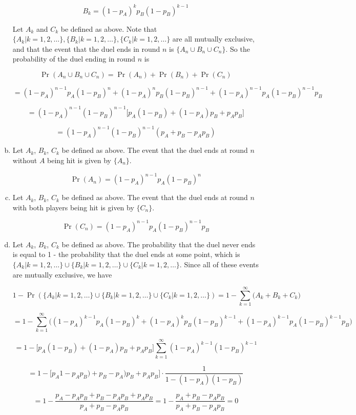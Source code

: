 \documentclass{article}
\begin{document}
\begin{enumerate}[(a)]
\[
B_k = (1 - p_A)^{{k}}p_B(1 - p_B)^{k-1}
\]

Let \(A_k\) and \(C_k\) be defined as above. Note that \(\{A_k | k = 1, 2, \ldots\} , \{B_k | k = 1, 2, \ldots\}, \{C_k | k = 1, 2, \ldots\}\) are all mutually exclusive, and that the event that the duel ends in round \(n\) is \(\{A_n \cup B_n \cup C_n\}\). So the probability of the duel ending in round \(n\) is

\[
\Pr(A_n \cup B_n \cup C_n) = \Pr(A_n) + \Pr(B_n) + \Pr(C_n) 
\]

\[
= (1 - p_A)^{n-1}p_A(1 - p_B)^{n} + (1 - p_A)^{{n}}p_B(1 - p_B)^{n-1} + (1 - p_A)^{{n-1}}p_A(1 - p_B)^{n-1}p_B
\]

\[
= (1 - p_A)^{n-1}(1 - p_B)^{n-1} \big[p_A(1 - p_B) + (1 - p_A)p_B + p_Ap_B \big]
\]

\[
= \boxed{(1 - p_A)^{n-1}(1 - p_B)^{n-1} (p_A + p_B - p_Ap_B )}
\]

\item Let \(A_k\), \(B_k\), \(C_k\) be defined as above. The event that the duel ends at round \(n\) without \(A\) being hit is given by \(\{ A_n\} \). 

\[
\Pr(A_n) = \boxed{(1 - p_A)^{{n-1}}p_A(1 - p_B)^{n}}
\]

\item Let \(A_k\), \(B_k\), \(C_k\) be defined as above. The event that the duel ends at round \(n\) with both players being hit is given by \(\{ C_n\} \). 

\[
\Pr(C_n) = \boxed{(1 - p_A)^{{n-1}}p_A(1 - p_B)^{n-1}p_B}
\]

\item Let \(A_k\), \(B_k\), \(C_k\) be defined as above. The probability that the duel never ends is equal to 1 - the probability that the duel ends at some point, which is  \(\{A_k | k = 1, 2, \ldots\} \cup \{B_k | k = 1, 2, \ldots\} \cup \{C_k | k = 1, 2, \ldots\}\). Since all of these events are mutually exclusive, we have

\[
1 - \Pr(\{A_k | k = 1, 2, \ldots\} \cup \{B_k | k = 1, 2, \ldots\} \cup \{C_k | k = 1, 2, \ldots\}) = 1 - \sum_{k = 1}^\infty \big(A_k + B_k + C_k\big)
\]

\[
= 1 - \sum_{k=1}^\infty \big( (1 - p_A)^{{k-1}}p_A(1 - p_B)^{k} + (1 - p_A)^{{k}}p_B(1 - p_B)^{k-1} + (1 - p_A)^{{k-1}}p_A(1 - p_B)^{k-1}p_B \big)
\]

\[
= 1 -   \big[p_A(1 - p_B) + (1 - p_A)p_B + p_Ap_B \big] \sum_{k=1}^\infty (1 - p_A)^{k-1}(1 - p_B)^{k-1} 
\]

\[
=  1 -  \big[ p_A1 - p_A p_B) + p_B - p_A)p_B + p_Ap_B \big] \cdot \frac{1}{1 - (1 - p_A)(1 - p_B)}
\]

\[
=1 -  \frac{p_A - p_Ap_B + p_B - p_Ap_B + p_Ap_B}{p_A + p_B - p_Ap_B} = 1 -  \frac{p_A + p_B - p_Ap_B}{p_A + p_B - p_Ap_B} = \boxed{0}
\]

\end{enumerate}
\end{document}
